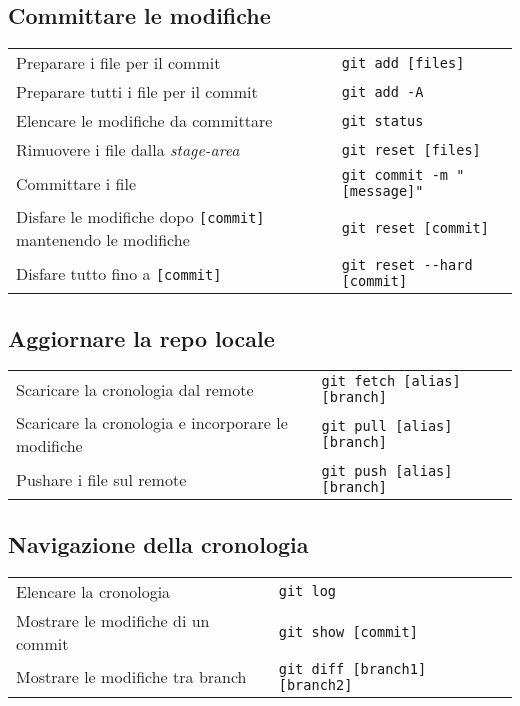 \documentclass[a4paper, 11pt]{article}
\begin{document}
		\subsection{Committare le modifiche}
		\begin{tabular}{p{9cm} p{6cm}}
			Preparare i file per il commit& \verb|git add [files]| \\
			Preparare tutti i file per il commit& \verb|git add -A| \\
			Elencare le modifiche da committare& \verb|git status|\\
			Rimuovere i file dalla \textit{stage-area}& \verb|git reset [files]|\\
			Committare i file& \verb|git commit -m "[message]"| \\
			Disfare le modifiche dopo \verb|[commit]| mantenendo le modifiche& \verb|git reset [commit]| \\
			Disfare tutto fino a \verb|[commit]|& \verb|git reset --hard [commit]|
		\end{tabular}
		
		\subsection{Aggiornare la repo locale}
		\begin{tabular}{p{9cm} p{6cm}}
			Scaricare la cronologia dal remote& \verb|git fetch [alias] [branch]| \\
			Scaricare la cronologia e incorporare le modifiche& \verb|git pull [alias] [branch]| \\
			Pushare i file sul remote& \verb|git push [alias] [branch]|\\
		\end{tabular}
		
		\subsection{Navigazione della cronologia}
		\begin{tabular}{p{9cm} p{6cm}}
			Elencare la cronologia& \verb|git log|\\
			Mostrare le modifiche di un commit& \verb|git show [commit]|\\
			Mostrare le modifiche tra branch& \verb|git diff [branch1] [branch2]|\\
		\end{tabular}
	
	
	

	


	
	
	
	
	
	
	
	
\end{document}
